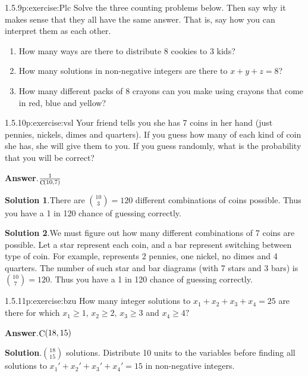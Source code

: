 \documentclass[twoside,11pt,]{book}
\newcommand{\blocktitlefont}{\relax}
\numberwithin{equation}{chapter}
\begin{document}
\begin{divisionsolution}{1.5.9}{}{p:exercise:Plc}%
Solve the three counting problems below. Then say why it makes sense that they all have the same answer. That is, say how you can interpret them as each other.%
\begin{enumerate}[label=(\alph*)]
\item{}How many ways are there to distribute 8 cookies to 3 kids?%
\item{}How many solutions in non-negative integers are there to \(x+y+z = 8\)?%
\item{}How many different packs of 8 crayons can you make using crayons that come in red, blue and yellow?%
\end{enumerate}
%
\end{divisionsolution}%
\begin{divisionsolution}{1.5.10}{}{p:exercise:vsl}%
Your friend tells you she has 7 coins in her hand (just pennies, nickels, dimes and quarters). If you guess how many of each kind of coin she has, she will give them to you. If you guess randomly, what is the probability that you will be correct?%
\par\smallskip%
\noindent\textbf{\blocktitlefont Answer}.\quad{}\(\frac{1}{\mathop{\rm C}\nolimits\!\left(10,7\right)}\)%
\par\smallskip%
\noindent\textbf{\blocktitlefont Solution 1}.\quad{}There are \({10 \choose 3} = 120\) different combinations of coins possible. Thus you have a 1 in 120 chance of guessing correctly.%
\par\smallskip%
\noindent\textbf{\blocktitlefont Solution 2}.\quad{}We must figure out how many different combinations of 7 coins are possible. Let a star represent each coin, and a bar represent switching between type of coin. For example, \textasteriskcentered{}\textasteriskcentered{}\textbar{}\textasteriskcentered{}\textbar{}\textbar{}\textasteriskcentered{}\textasteriskcentered{}\textasteriskcentered{}\textasteriskcentered{} represents 2 pennies, one nickel, no dimes and 4 quarters. The number of such star and bar diagrams (with 7 stars and 3 bars) is \({10 \choose 7} = 120\text{.}\) Thus you have a 1 in 120 chance of guessing correctly.%
\end{divisionsolution}%
\begin{divisionsolution}{1.5.11}{}{p:exercise:bzu}%
How many integer solutions to \(x_1 + x_2 + x_3 + x_4 = 25\) are there for which \(x_1 \ge 1\text{,}\) \(x_2 \ge 2\text{,}\) \(x_3 \ge 3\) and \(x_4 \ge 4\text{?}\)%
\par\smallskip%
\noindent\textbf{\blocktitlefont Answer}.\quad{}\(\mathop{\rm C}\nolimits\!\left(18,15\right)\)%
\par\smallskip%
\noindent\textbf{\blocktitlefont Solution}.\quad{}\({18 \choose 15}\) solutions. Distribute 10 units to the variables before finding all solutions to \(x_1' + x_2' + x_3' + x_4' = 15\) in non-negative integers.%
\end{divisionsolution}%
\end{document}
